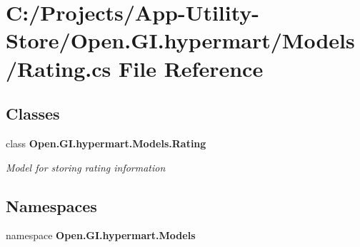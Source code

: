 \section{C\+:/\+Projects/\+App-\/\+Utility-\/\+Store/\+Open.G\+I.\+hypermart/\+Models/\+Rating.cs File Reference}
\label{_rating_8cs}
\subsection*{Classes}
\begin{DoxyCompactItemize}
\item 
class \textbf{ Open.\+G\+I.\+hypermart.\+Models.\+Rating}
\begin{DoxyCompactList}\small\item\em Model for storing rating information \end{DoxyCompactList}\end{DoxyCompactItemize}
\subsection*{Namespaces}
\begin{DoxyCompactItemize}
\item 
namespace \textbf{ Open.\+G\+I.\+hypermart.\+Models}
\end{DoxyCompactItemize}
